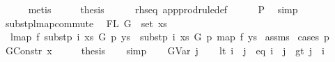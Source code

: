 \begin{isabellebody}
\ \ \ \ \isamarkupfalse%
\ metis\isanewline
\ \ \isamarkupfalse%
\ \isamarkupfalse%
\ {\isacharquery}{\kern0pt}thesis\isanewline
\ \ \ \ \isamarkupfalse%
\ rhs{\isacharunderscore}{\kern0pt}eq\ app{\isacharunderscore}{\kern0pt}prodrule{\isacharunderscore}{\kern0pt}def\isanewline
\ \ \ \ \isamarkupfalse%
\ P{}\ \isamarkupfalse%
\ simp\isanewline
{}\isamarkupfalse%
%
\endisatagproof
{\isafoldproof}%
%
\isadelimproof
%
\endisadelimproof
%
\isadelimdocument
%
\endisadelimdocument
%
\isatagdocument
%
\isamarkuptrue%
%
\endisatagdocument
{\isafolddocument}%
%
\isadelimdocument
%
\endisadelimdocument
{}\isamarkupfalse%
\ subst{\isacharunderscore}{\kern0pt}p{\isacharunderscore}{\kern0pt}lmap{\isacharunderscore}{\kern0pt}commute{\isacharcolon}{\kern0pt}\isanewline
\ \ {\isachardoublequoteopen}FL\ G\ {\isasymsubseteq}\ set\ xs{\isachardoublequoteclose}\isanewline
\ \ {\isachardoublequoteopen}lmap\ f\ {\isacharparenleft}{\kern0pt}subst{\isacharunderscore}{\kern0pt}p\ i\ xs\ G\ p\ ys{\isacharparenright}{\kern0pt}\ {\isacharequal}{\kern0pt}\ subst{\isacharunderscore}{\kern0pt}p\ i\ xs\ G\ p\ {\isacharparenleft}{\kern0pt}map\ f\ ys{\isacharparenright}{\kern0pt}{\isachardoublequoteclose}\isanewline
%
\isadelimproof
%
\endisadelimproof
%
\isatagproof
{}\isamarkupfalse%
\ assms\isanewline
{}\isamarkupfalse%
\ {\isacharparenleft}{\kern0pt}cases\ p{\isacharparenright}{\kern0pt}\isanewline
\ \ \isamarkupfalse%
\ {\isacharparenleft}{\kern0pt}GConstr\ x{}{\isacharparenright}{\kern0pt}\isanewline
\ \ \isamarkupfalse%
\ \isamarkupfalse%
\ {\isacharquery}{\kern0pt}thesis\isanewline
\ \ \isamarkupfalse%
\ simp\isanewline
{}\isamarkupfalse%
\isanewline
\ \ \isamarkupfalse%
\ {\isacharparenleft}{\kern0pt}GVar\ j{\isacharparenright}{\kern0pt}\isanewline
\ \ \isamarkupfalse%
\ {\isacharparenleft}{\kern0pt}lt{\isacharparenright}{\kern0pt}\ {\isachardoublequoteopen}i\ {\isacharless}{\kern0pt}\ j{\isachardoublequoteclose}\ {\isacharbar}{\kern0pt}\ {\isacharparenleft}{\kern0pt}eq{\isacharparenright}{\kern0pt}\ {\isachardoublequoteopen}i\ {\isacharequal}{\kern0pt}\ j{\isachardoublequoteclose}\ {\isacharbar}{\kern0pt}\ {\isacharparenleft}{\kern0pt}gt{\isacharparenright}{\kern0pt}\ {\isachardoublequoteopen}j\ {\isacharless}{\kern0pt}\ i{\isachardoublequoteclose}\isanewline

\end{isabellebody}
